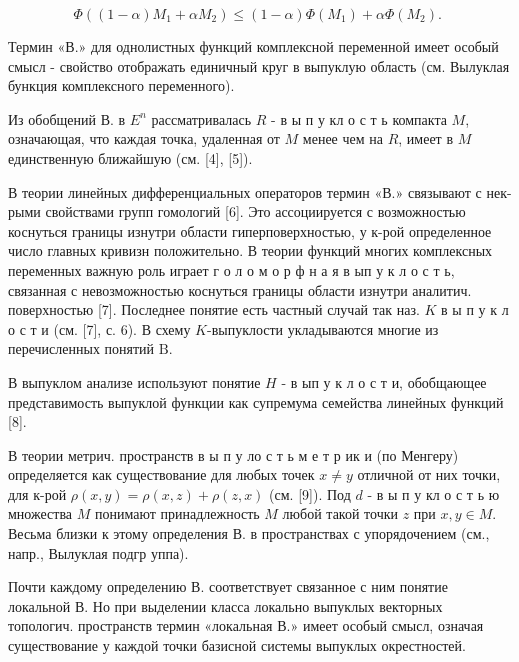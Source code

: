 \documentclass[10pt]{article}
\begin{document}
\[

\Phi\left((1-\alpha) M_{1}+\alpha M_{2}\right) \leqslant(1-\alpha) \Phi\left(M_{1}\right)+\alpha \Phi\left(M_{2}\right) \text {. }

\]



Термин «В.» для однолистных функций комплексной переменной имеет особый смысл - свойство отображать единичный круг в выпуклую область (см. Вылуклая бункция комплексного переменного).



Из обобщений В. в $E^{n}$ рассматривалась $R$ - в ы п у кл о с т ь компакта $M$, означающая, что каждая точка, удаленная от $M$ менее чем на $R$, имеет в $M$ единственную ближайшую (см. [4], [5]).



В теории линейных дифференциальных операторов термин «В.» связывают с нек-рыми свойствами групп гомологий [6]. Это ассоциируется с возможностью коснуться границы изнутри области гиперповерхностью, у к-рой определенное число главных кривизн положительно. В теории функций многих комплексных переменных важную роль играет г о л о м о р ф н а я в ып у к л о с т ь, связанная с невозможностью коснуться границы области изнутри аналитич. поверхностью [7]. Последнее понятие есть частный случай так наз. $K$ в ы п у к л о с т и (см. [7], с. 6). В схему $K$-выпуклости укладываются многие из перечисленных понятий $\mathrm{B}$.



В выпуклом анализе используют понятие $H$ - в ып у к л о с т и, обобщающее представимость выпуклой функции как супремума семейства линейных функций [8].



В теории метрич. пространств в ы п у ло с т ь м е т р ик и (по Менгеру) определяется как существование для любых точек $x \neq y$ отличной от них точки, для к-рой $\rho(x, y)=\rho(x, z)+\rho(z, x)$ (см. [9]). Под $d$ - в ы п у кл о с т ь ю множества $M$ понимают принадлежность $M$ любой такой точки $z$ при $x, y \in M$. Весьма близки к этому определения В. в пространствах с упорядочением (см., напр., Вылуклая подгр уппа).



Почти каждому определению В. соответствует связанное с ним понятие локальной В. Но при выделении класса локально выпуклых векторных топологич. пространств термин «локальная В.» имеет особый смысл, означая существование у каждой точки базисной системы выпуклых окрестностей.
\end{document}
